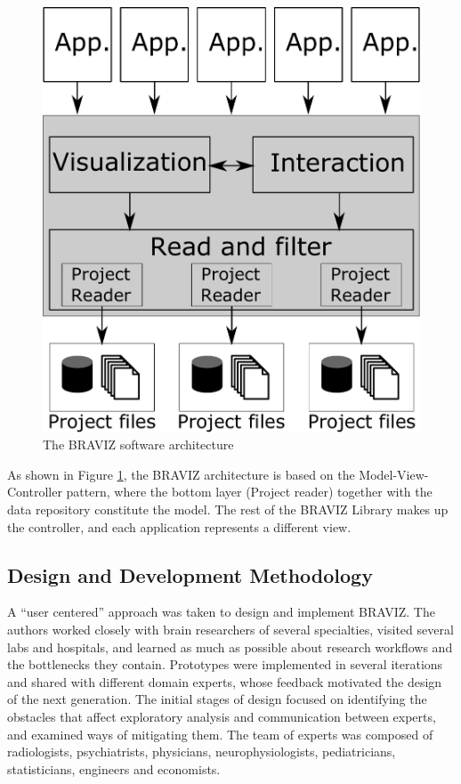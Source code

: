 \documentclass[twocolumn]{svjour3}
\begin{document}
\begin{figure}
\begin{center}
\includegraphics[width=0.6\linewidth]{arquitecture.pdf}
\end{center}
 \caption{\label{fig_arch} The BRAVIZ software architecture}
\end{figure}

As shown in Figure \ref{fig_arch}, the BRAVIZ architecture is based on the Model-View-Controller pattern, where the bottom layer (Project reader) together with the data repository constitute the model. The rest of the BRAVIZ Library makes up the controller, and each application represents a different view.

\subsection{Design and Development Methodology}

A ``user centered'' approach \cite{wassink_applying_2009} was taken to design and implement BRAVIZ. The authors worked closely with brain researchers of several specialties, visited several labs and hospitals, and learned as much as possible about research workflows and the bottlenecks they contain. Prototypes were implemented in several iterations and shared with different domain experts, whose feedback motivated the design of the next generation.
The initial stages of design focused on identifying the obstacles that affect exploratory analysis and communication between experts, and examined ways of mitigating them. The team of experts was composed of radiologists, psychiatrists, physicians, neurophysiologists, pediatricians, statisticians, engineers and economists.
\end{document}
